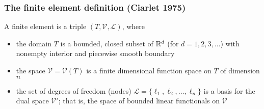 \begin{frame}
  \frametitle{The finite element definition (Ciarlet 1975)}

  A finite element is a triple $(T, \mathcal{V}, \mathcal{L})$, where
  \begin{itemize}
  \item
    the domain $T$ is a bounded, closed subset of $\mathbb{R}^d$ (for $d = 1,
    2, 3, \dots$) with nonempty interior and piecewise smooth
    boundary
  \item
    the space $\mathcal{V} = \mathcal{V}(T)$ is a finite
    dimensional function space on $T$ of dimension $n$
  \item
    the set of degrees of freedom (nodes) $\mathcal{L} = \{\ell_1,
    \ell_2,\ldots, \ell_{n}\}$ is a basis for the dual space
    $\mathcal{V}'$; that is, the space of bounded linear functionals
    on $\mathcal{V}$
  \end{itemize}

\end{frame}
